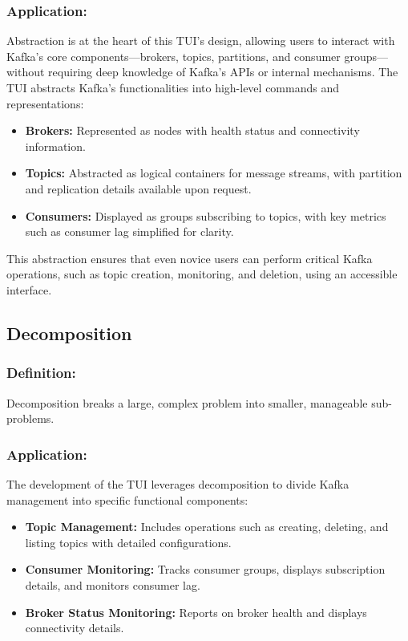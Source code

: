 \documentclass[10pt , a4paper]{report}
\begin{document}
\subsubsection*{Application:}  
Abstraction is at the heart of this TUI’s design, allowing users to interact with Kafka’s core components—brokers, topics, partitions, and consumer groups—without requiring deep knowledge of Kafka’s APIs or internal mechanisms. The TUI abstracts Kafka’s functionalities into high-level commands and representations:
\begin{itemize}
    \item \textbf{Brokers:} Represented as nodes with health status and connectivity information.
    \item \textbf{Topics:} Abstracted as logical containers for message streams, with partition and replication details available upon request.
    \item \textbf{Consumers:} Displayed as groups subscribing to topics, with key metrics such as consumer lag simplified for clarity.
\end{itemize}

This abstraction ensures that even novice users can perform critical Kafka operations, such as topic creation, monitoring, and deletion, using an accessible interface.

\subsection{Decomposition}

\subsubsection*{Definition:}  
Decomposition breaks a large, complex problem into smaller, manageable sub-problems.

\subsubsection*{Application:}  
The development of the TUI leverages decomposition to divide Kafka management into specific functional components:
\begin{itemize}
    \item \textbf{Topic Management:} Includes operations such as creating, deleting, and listing topics with detailed configurations.
    \item \textbf{Consumer Monitoring:} Tracks consumer groups, displays subscription details, and monitors consumer lag.
    \item \textbf{Broker Status Monitoring:} Reports on broker health and displays connectivity details.
\end{itemize}
\end{document}
